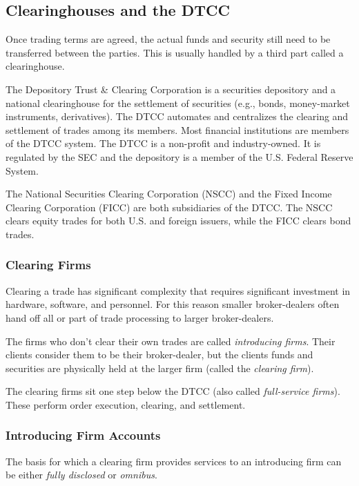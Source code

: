 \medskip

\subsection{Clearinghouses and the DTCC}

Once trading terms are agreed, the actual funds and security still need to be transferred between the parties. This is usually handled by a third part called a clearinghouse. 

The Depository Trust \& Clearing Corporation is a securities depository and a national clearinghouse for the settlement of securities (e.g., bonds, money-market instruments, derivatives). The DTCC automates and centralizes the clearing and settlement of trades among its members. Most financial institutions are members of the DTCC system. The DTCC is a non-profit and industry-owned. It is regulated by the SEC and the depository is a member of the U.S. Federal Reserve System. 

The National Securities Clearing Corporation (NSCC) and the Fixed Income Clearing Corporation (FICC) are both subsidiaries of the DTCC. The NSCC clears equity trades for both U.S. and foreign issuers, while the FICC clears bond trades.


\subsubsection{Clearing Firms}

Clearing a trade has significant complexity that requires significant investment in hardware, software, and personnel. For this reason smaller broker-dealers often hand off all or part of trade processing to larger broker-dealers.

The firms who don't clear their own trades are called \textit{introducing firms}. Their clients consider them to be their broker-dealer, but the clients funds and securities are physically held at the larger firm (called the \textit{clearing firm}).

The clearing firms sit one step below the DTCC (also called \textit{full-service firms}). These perform order execution, clearing, and settlement. 

\medskip

\subsubsection{Introducing Firm Accounts}

The basis for which a clearing firm provides services to an introducing firm can be either \textit{fully disclosed} or \textit{omnibus}.

